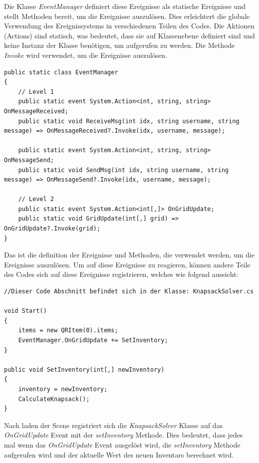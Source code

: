 Die Klasse \textit{EventManager} definiert diese Ereignisse als statische Ereignisse und stellt Methoden bereit, um die
Ereignisse auszulösen. Dies erleichtert die globale Verwendung des Ereignissystems in verschiedenen Teilen des Codes.
Die Aktionen (Actions) sind statisch, was bedeutet, dass sie auf Klassenebene definiert sind und keine Instanz der Klasse
benötigen, um aufgerufen zu werden. Die Methode \textit{Invoke} wird verwendet, um die Ereignisse auszulösen.

\begin{lstlisting}[style=csharp, label=code:EventManager]
public static class EventManager
{
    // Level 1
    public static event System.Action<int, string, string> OnMessageReceived;
    public static void ReceiveMsg(int idx, string username, string message) => OnMessageReceived?.Invoke(idx, username, message);

    public static event System.Action<int, string, string> OnMessageSend;
    public static void SendMsg(int idx, string username, string message) => OnMessageSend?.Invoke(idx, username, message);

    // Level 2
    public static event System.Action<int[,]> OnGridUpdate;
    public static void GridUpdate(int[,] grid) => OnGridUpdate?.Invoke(grid);
}
\end{lstlisting}

Das ist die definition der Ereignisse und Methoden, die verwendet werden, um die Ereignisse auszulösen.
Um auf diese Ereignisse zu reagieren, können andere Teile des Codes sich auf diese Ereignisse registrieren, welches wie folgend
aussieht:

\begin{lstlisting}[style=csharp label=code:Event Registration]
//Dieser Code Abschnitt befindet sich in der Klasse: KnapsackSolver.cs

void Start()
{
    items = new QRItem(0).items;
    EventManager.OnGridUpdate += SetInventory;
}

public void SetInventory(int[,] newInventory)
{
    inventory = newInventory;
    CalculateKnapsack();
}
\end{lstlisting}

Nach laden der Scene registriert sich die \textit{KnapsackSolver} Klasse auf das \textit{OnGridUpdate} Event mit
der \textit{setInventory} Methode. Dies bedeutet, dass jedes mal wenn das \textit{OnGridUpdate} Event ausgelöst wird,
die \textit{setInventory} Methode aufgerufen wird und der aktuelle Wert des neuen Inventars berechnet wird.

